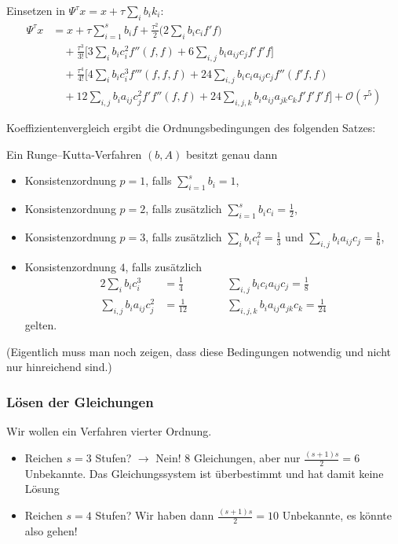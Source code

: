 Einsetzen in $\Psi^{\tau} x=x+\tau \sum_i b_ik_i$:
\begin{align*}
	\Psi^{\tau} x
	& =
	x+\tau \sum_{i=1}^s b_i f +\frac{\tau^2}{2} \bigg(2 \sum_i b_ic_i f'f \bigg) \\
	& \quad +
	\frac{\tau^3}{3!} \bigg[3 \sum_i b_ic_i^2 f'' (f,f)+6 \sum_{i,j} b_ia_{ij}c_j f'f'f \bigg] \\
	& \quad +
	\frac{\tau^4}{4!} \bigg[4 \sum_i b_ic_i^3 f''' (f,f,f)+24 \sum_{i,j} b_ic_ia_{ij}c_j f'' (f'f,f) \\
	& \quad
	+ 12 \sum_{i,j} b_ia_{ij}c_j^2 f' f'' (f,f) + 24 \sum_{i,j,k} b_ia_{ij}a_{jk}c_k f' f' f' f \bigg]
	+\mathcal{O}(\tau^5)
\end{align*}

Koeffizientenvergleich ergibt die Ordnungsbedingungen des folgenden Satzes:

\begin{satz}
	Ein Runge--Kutta-Verfahren $(b,A)$ besitzt genau dann
	\begin{itemize}
		\item Konsistenzordnung $p=1$, falls $\sum\limits_{i=1}^s b_i=1$,
		\item Konsistenzordnung $p=2$, falls zusätzlich $\sum\limits_{i=1}^s b_ic_i=\frac{1}{2}$,
		\item Konsistenzordnung $p=3$, falls zusätzlich $\sum\limits_i b_ic_i^2=\frac{1}{3}$ und $\sum\limits_{i,j} b_ia_{ij}c_j=\frac{1}{6}$,
		\item Konsistenzordnung $4$, falls zusätzlich
		\begin{alignat*}{2}
			\sum_i b_ic_i^3 & =\frac{1}{4} & \qquad & \sum_{i,j} b_ic_ia_{ij}c_j=\frac{1}{8} \\
			\sum_{i,j} b_ia_{ij}c_j^2 & =\frac{1}{12} && \sum_{i,j,k} b_ia_{ij}a_{jk}c_k=\frac{1}{24}
		\end{alignat*}
		gelten.
	\end{itemize}
\end{satz}
(Eigentlich muss man noch zeigen, dass diese Bedingungen notwendig und nicht nur hinreichend sind.)

\subsubsection{Lösen der Gleichungen}

Wir wollen ein Verfahren vierter Ordnung.
\begin{itemize}
	\item Reichen $s=3$ Stufen? $\to$ Nein! 8 Gleichungen, aber nur $\frac{(s+1)s}{2}=6$ Unbekannte. Das Gleichungssystem ist überbestimmt und hat damit keine Lösung
	\item Reichen $s=4$ Stufen? Wir haben dann $\frac{(s+1)s}{2}=10$ Unbekannte, es könnte also gehen!
\end{itemize}

